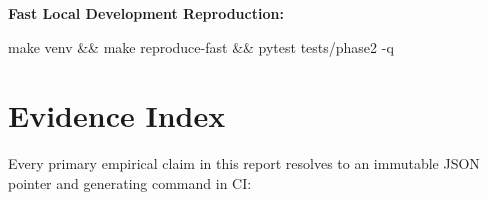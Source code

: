 \vspace{3pt}
\noindent\textbf{Fast Local Development Reproduction:}\\
\colorbox{codebg}{%
\begin{minipage}{0.98\textwidth}
\ttfamily\scriptsize
make venv \&\& make reproduce-fast \&\& pytest tests/phase2 -q
\end{minipage}%
}

\section{Evidence Index}

Every primary empirical claim in this report resolves to an immutable JSON pointer and generating command in CI:

